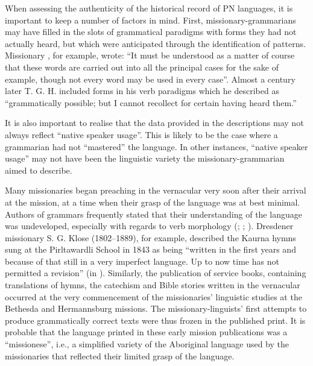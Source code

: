When assessing the authenticity of the historical record of PN languages, it is important to keep a number of factors in mind. First, missionary-grammarians may have filled in the slots of grammatical paradigms with forms they had not actually heard, but which were anticipated through the identification of patterns. Missionary \citet[350]{gunther_lecture_1840}, for example, wrote: “It must be understood as a matter of course that these words are carried out into all the principal cases for the sake of example, though not every word may be used in every case”. Almost a century later T. G. H. \citet[171]{strehlow_aranda_1944} included forms in his verb paradigms which he described as “grammatically possible; but I cannot recollect for certain having heard them.”

It is also important to realise that the data provided in the descriptions may not always reflect “native speaker usage''. This is likely to be the case where a grammarian had not “mastered” the language. In other instances, “native speaker usage” may not have been the linguistic variety the missionary-grammarian aimed to describe. 

Many missionaries began preaching in the vernacular very soon after their arrival at the mission, at a time when their grasp of the language was at best minimal. Authors of grammars frequently stated that their understanding of the language was undeveloped, especially with regards to verb morphology (\citealt[28]{threlkeld_australian_1834}; \citealt[13]{teichelmann_outlines_1840}; \citealt[16]{schurmann_vocabulary_1844}). Dresdener missionary S. G. Klose (1802--1889), for example, described the Kaurna hymns sung at the Pirltawardli School in 1843 as being “written in the first years and because of that still in a very imperfect language. Up to now time has not permitted a revision” (in \citealt[27]{graetz_open_1988}). Similarly, the publication of service books, containing translations of hymns, the catechism and Bible stories written in the vernacular occurred at the very commencement of the missionaries' linguistic studies at the Bethesda and Hermannsburg missions. The missionary-linguists' first attempts to produce grammatically correct texts were thus frozen in the published print. It is probable that the language printed in these early mission publications was a “missionese'', i.e., a simplified variety of the Aboriginal language used by the missionaries that reflected their limited grasp of the language.

